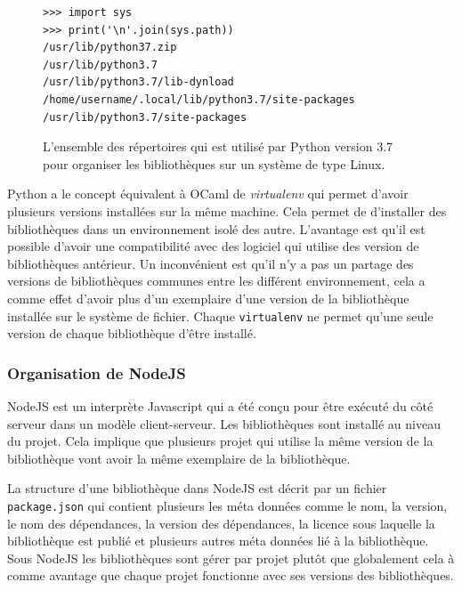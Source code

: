 \begin{figure}[ht]
    \begin{minipage}[t]{0.5\textwidth}
\begin{verbatim}
>>> import sys
>>> print('\n'.join(sys.path))
/usr/lib/python37.zip
/usr/lib/python3.7
/usr/lib/python3.7/lib-dynload
/home/username/.local/lib/python3.7/site-packages
/usr/lib/python3.7/site-packages
\end{verbatim}
    \end{minipage}
    \caption{L'ensemble des répertoires qui est utilisé par Python version 3.7
    pour organiser les bibliothèques sur un système de type Linux.}
\end{figure}

Python a le concept équivalent à OCaml de \textit{virtualenv} qui permet d'avoir plusieurs
versions installées sur la même machine. Cela permet de d'installer des
bibliothèques dans un environnement isolé des autre. L'avantage est qu'il est
possible d'avoir une compatibilité avec des logiciel qui utilise des version de
bibliothèques antérieur. Un inconvénient est qu'il n'y a pas un partage des
versions de bibliothèques communes entre les différent environnement, cela a
comme effet d'avoir plus d'un exemplaire d'une version de la bibliothèque installée
sur le système de fichier. Chaque \texttt{virtualenv} ne permet qu'une seule version de
chaque bibliothèque d'être installé.


\subsubsection{Organisation de NodeJS}
NodeJS est un interprète Javascript qui a été conçu pour être exécuté
du côté serveur dans un modèle client-serveur. Les bibliothèques sont
installé au niveau du projet. Cela implique que plusieurs projet qui
utilise la même version de la bibliothèque vont avoir la même exemplaire
de la bibliothèque.

La structure d'une bibliothèque dans NodeJS est décrit par un fichier
\texttt{package.json} qui contient plusieurs les méta données comme
le nom, la version, le nom des dépendances, la version des dépendances,
la licence sous laquelle la bibliothèque est publié et plusieurs autres
méta données lié à la bibliothèque. Sous NodeJS les bibliothèques sont gérer
par projet plutôt que globalement cela à comme avantage que chaque projet
fonctionne avec ses versions des bibliothèques.

